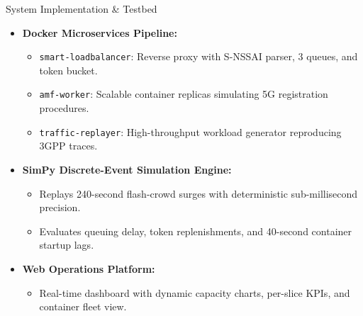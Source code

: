 \documentclass[aspectratio=169,11pt]{beamer}
\begin{document}
\begin{frame}{System Implementation \& Testbed}
  \begin{itemize}
    \setlength\itemsep{0.9em}
    \item \textbf{Docker Microservices Pipeline:}
      \begin{itemize}
        \item \texttt{smart-loadbalancer}: Reverse proxy with S-NSSAI parser, 3 queues, and token bucket.
        \item \texttt{amf-worker}: Scalable container replicas simulating 5G registration procedures.
        \item \texttt{traffic-replayer}: High-throughput workload generator reproducing 3GPP traces.
      \end{itemize}
    \item \textbf{SimPy Discrete-Event Simulation Engine:}
      \begin{itemize}
        \item Replays 240-second flash-crowd surges with deterministic sub-millisecond precision.
        \item Evaluates queuing delay, token replenishments, and 40-second container startup lags.
      \end{itemize}
    \item \textbf{Web Operations Platform:}
      \begin{itemize}
        \item Real-time dashboard with dynamic capacity charts, per-slice KPIs, and container fleet view.
      \end{itemize}
  \end{itemize}
\end{frame}
\end{document}
